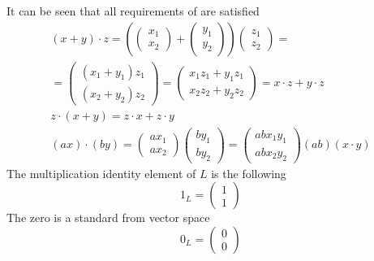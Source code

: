 \begin{example}
  It can be seen that all requirements of  are
  satisfied
  \begin{eqnarray}
    (x + y) \cdot z =
    \left(
    \left(
    \begin{array}{c}
      x_1 \\
      x_2
    \end{array}
    \right)
    +
    \left(
    \begin{array}{c}
      y_1 \\
      y_2
    \end{array}
    \right)
    \right)
    \left(
    \begin{array}{c}
      z_1 \\
      z_2
    \end{array}
    \right) =
    \nonumber \\
    =
    \left(
    \begin{array}{c}
      (x_1 + y_1)z_1 \\
      (x_2 + y_2)z_2
    \end{array}
    \right) =
        \left(
    \begin{array}{c}
      x_1 z_1 + y_1 z_1 \\
      x_2 z_2 + y_2 z_2
    \end{array}
    \right) =
    x \cdot z + y \cdot z
    \nonumber \\
    z \cdot (x + y) = z \cdot x + z \cdot y
    \nonumber \\
    (ax) \cdot (by) =
    \left(
    \begin{array}{c}
      a x_1 \\
      a x_2
    \end{array}
    \right)
    \left(
    \begin{array}{c}
      b y_1 \\
      b y_2
    \end{array}
    \right) =
    \left(
    \begin{array}{c}
      ab x_1 y_1 \\
      ab x_2 y_2
    \end{array}
    \right)
    (ab) (x \cdot y)
    \nonumber
  \end{eqnarray}
  The multiplication identity element of $L$ is the following
  \[
  1_L = 
  \left(
    \begin{array}{c}
      1 \\
      1
    \end{array}
    \right)
  \]
  The zero is a standard from vector space
  \[
  0_L = 
  \left(
  \begin{array}{c}
    0 \\
    0
  \end{array}
  \right)
  \]


\end{example}
